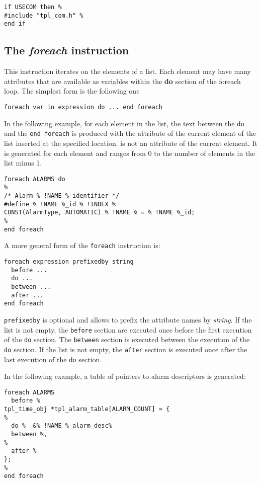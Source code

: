 \begin{lstlisting}
if USECOM then %
#include "tpl_com.h" %
end if
\end{lstlisting}

\subsection{The {\em foreach} instruction}

This instruction iterates on the elements of a list. Each element may have many attributes that are available as variables within the {\bf do} section of the foreach loop. The simplest form is the following one

\begin{lstlisting}
foreach var in expression do ... end foreach
\end{lstlisting}

In the following example, for each element in the  list, the text between the {\tt do} and the {\tt end foreach} is produced with the  attribute of the current element of the  list inserted at the specified location.  is not an attribute of the current element. It is generated for each element and ranges from 0 to the number of elements in the list minus 1.
\begin{lstlisting}
foreach ALARMS do
%
/* Alarm % !NAME % identifier */
#define % !NAME %_id % !INDEX %
CONST(AlarmType, AUTOMATIC) % !NAME % = % !NAME %_id;
%
end foreach
\end{lstlisting}

A more general form of the {\tt foreach} instruction is:

\begin{lstlisting}
foreach expression prefixedby string
  before ...
  do ...
  between ...
  after ...
end foreach
\end{lstlisting}

{\tt prefixedby} is optional and allows to prefix the attribute names by {\em string}. If the list is not empty, the {\tt before} section are executed once before the first execution of the {\tt do} section. The {\tt between} section is executed between the execution of the {\tt do} section.  If the list is not empty, the {\tt after} section is executed once after the last execution of the {\tt do} section.

In the following example, a table of pointers to alarm descriptors is generated:

\begin{lstlisting}
foreach ALARMS
  before %
tpl_time_obj *tpl_alarm_table[ALARM_COUNT] = {
%
  do %  &% !NAME %_alarm_desc%
  between %,
%
  after %
};
%
end foreach
\end{lstlisting}


